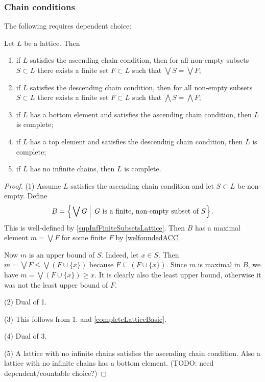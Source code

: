 \subsubsection{Chain conditions}
The following requires dependent choice:
\begin{proposition} \label{ascendingDescendingChainLattice}
Let $L$ be a lattice. Then
\begin{enumerate}
\item if $L$ satisfies the ascending chain condition, then for all non-empty subsets $S\subset L$ there exists a finite set $F\subset L$ such that $\bigvee S = \bigvee F$;
\item if $L$ satisfies the descending chain condition, then for all non-empty subsets $S\subset L$ there exists a finite set $F\subset L$ such that $\bigwedge S = \bigwedge F$;
\item if $L$ has a bottom element and satisfies the ascending chain condition, then $L$ is complete;
\item if $L$ has a top element and satisfies the descending chain condition, then $L$ is complete;
\item if $L$ has no infinite chains, then $L$ is complete.
\end{enumerate}
\end{proposition}
\begin{proof}
(1) Assume $L$ satisfies the ascending chain condition and let $S\subset L$ be non-empty. Define
\[ B = \left\{\left. \bigvee G \;\right|\; \text{$G$ is a finite, non-empty subset of $S$} \right\}. \]
This is well-defined by \ref{supInfFiniteSubsetsLattice}. Then $B$ has a maximal element $m = \bigvee F$ for some finite $F$ by \ref{welfoundedACC}.

Now $m$ is an upper bound of $S$. Indeed, let $x\in S$. Then $m= \bigvee F \leq \bigvee (F\cup\{x\})$ because $F\subseteq (F\cup \{x\})$. Since $m$ is maximal in $B$, we have $m = \bigvee (F\cup\{x\}) \geq x$. It is clearly also the least upper bound, otherwise it was not the least upper bound of $F$.

(2) Dual of 1.

(3) This follows from 1. and \ref{completeLatticeBasic}.

(4) Dual of 3.

(5) A lattice with no infinite chains satisfies the ascending chain condition. Also a lattice
with no infinite chains has a bottom element. (TODO: need dependent/countable choice?)
\end{proof}

